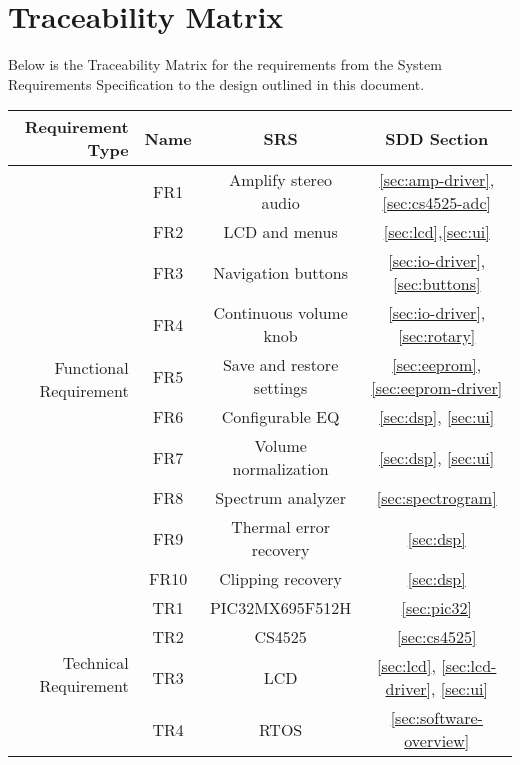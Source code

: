 \chapter{Traceability Matrix}

Below is the Traceability Matrix for the requirements from the System Requirements Specification to the design outlined in this document.

\begin{center}
\begin{tabular}{| r | c | c | c |}
\hline
\textbf{Requirement Type} & \textbf{Name} &  \textbf{SRS} & \textbf{SDD Section} \\
\hline
\multirow{10}{*}{Functional Requirement} & FR1 & Amplify stereo audio & \ref{sec:amp-driver}, \ref{sec:cs4525-adc} \\
 & FR2 & LCD and menus & \ref{sec:lcd},\ref{sec:ui} \\
 & FR3 & Navigation buttons & \ref{sec:io-driver}, \ref{sec:buttons} \\
 & FR4 & Continuous volume knob & \ref{sec:io-driver}, \ref{sec:rotary} \\
 & FR5 & Save and restore settings & \ref{sec:eeprom}, \ref{sec:eeprom-driver} \\
 & FR6 & Configurable EQ & \ref{sec:dsp}, \ref{sec:ui} \\
 & FR7 & Volume normalization & \ref{sec:dsp}, \ref{sec:ui}\\
 & FR8 & Spectrum analyzer & \ref{sec:spectrogram} \\
 & FR9 & Thermal error recovery & \ref{sec:dsp}\\
 & FR10 & Clipping recovery & \ref{sec:dsp} \\
\hline
\multirow{4}{*}{Technical Requirement} & TR1 & PIC32MX695F512H & \ref{sec:pic32} \\
 & TR2 & CS4525 & \ref{sec:cs4525} \\
 & TR3 & LCD & \ref{sec:lcd}, \ref{sec:lcd-driver}, \ref{sec:ui} \\
 & TR4 & RTOS & \ref{sec:software-overview}\\
\hline
\end{tabular}
\end{center}
